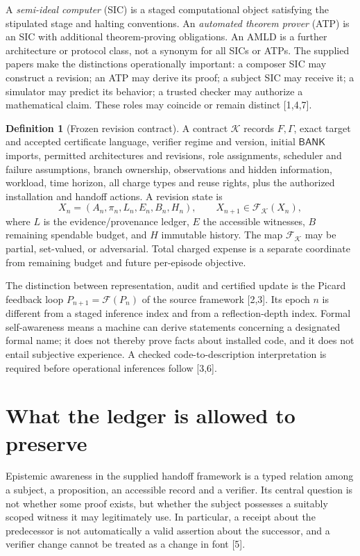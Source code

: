 \documentclass[11pt,letterpaper]{article}
\theoremstyle{definition}
\newtheorem{definition}[theorem]{Definition}
\theoremstyle{remark}
\newcommand{\K}{\mathcal K}
\newcommand{\F}{\mathcal F}
\newcommand{\Bank}{\mathsf{BANK}}
\newcommand{\src}[1]{\textup{[#1]}}
\begin{document}
A \emph{semi-ideal computer} (SIC) is a staged computational object satisfying the stipulated stage and halting conventions. An \emph{automated theorem prover} (ATP) is an SIC with additional theorem-proving obligations. An AMLD is a further architecture or protocol class, not a synonym for all SICs or ATPs. The supplied papers make the distinctions operationally important: a composer SIC may construct a revision; an ATP may derive its proof; a subject SIC may receive it; a simulator may predict its behavior; a trusted checker may authorize a mathematical claim. These roles may coincide or remain distinct \src{1,4,7}.

\begin{definition}[Frozen revision contract]\label{def:contract}
A contract $\K$ records $F,\Gamma$, exact target and accepted certificate language, verifier regime and version, initial $\Bank$ imports, permitted architectures and revisions, role assignments, scheduler and failure assumptions, branch ownership, observations and hidden information, workload, time horizon, all charge types and reuse rights, plus the authorized installation and handoff actions. A revision state is
\[
 X_n=(A_n,\pi_n,L_n,E_n,B_n,H_n),\qquad X_{n+1}\in\F_{\K}(X_n),
\]
where $L$ is the evidence/provenance ledger, $E$ the accessible witnesses, $B$ remaining spendable budget, and $H$ immutable history. The map $\F_{\K}$ may be partial, set-valued, or adversarial. Total charged expense is a separate coordinate from remaining budget and future per-episode objective.
\end{definition}

The distinction between representation, audit and certified update is the Picard feedback loop $P_{n+1}=\F(P_n)$ of the source framework \src{2,3}. Its epoch $n$ is different from a staged inference index and from a reflection-depth index. Formal self-awareness means a machine can derive statements concerning a designated formal name; it does not thereby prove facts about installed code, and it does not entail subjective experience. A checked code-to-description interpretation is required before operational inferences follow \src{3,6}.

\section{What the ledger is allowed to preserve}
Epistemic awareness in the supplied handoff framework is a typed relation among a subject, a proposition, an accessible record and a verifier. Its central question is not whether some proof exists, but whether the subject possesses a suitably scoped witness it may legitimately use. In particular, a receipt about the predecessor is not automatically a valid assertion about the successor, and a verifier change cannot be treated as a change in font \src{5}.
\end{document}
